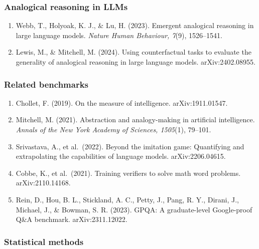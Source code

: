 \subsubsection{Analogical reasoning in LLMs}\label{analogical-reasoning-in-llms}

\begin{enumerate}
\def\labelenumi{\arabic{enumi}.}
\setcounter{enumi}{25}
\tightlist
\item
  Webb, T., Holyoak, K. J., \& Lu, H. (2023). Emergent analogical reasoning in large language models. \emph{Nature Human Behaviour, 7}(9), 1526--1541.
\item
  Lewis, M., \& Mitchell, M. (2024). Using counterfactual tasks to evaluate the generality of analogical reasoning in large language models. arXiv:2402.08955.
\end{enumerate}

\subsubsection{Related benchmarks}\label{related-benchmarks}

\begin{enumerate}
\def\labelenumi{\arabic{enumi}.}
\setcounter{enumi}{27}
\tightlist
\item
  Chollet, F. (2019). On the measure of intelligence. arXiv:1911.01547.
\item
  Mitchell, M. (2021). Abstraction and analogy-making in artificial intelligence. \emph{Annals of the New York Academy of Sciences, 1505}(1), 79--101.
\item
  Srivastava, A., et al.~(2022). Beyond the imitation game: Quantifying and extrapolating the capabilities of language models. arXiv:2206.04615.
\item
  Cobbe, K., et al.~(2021). Training verifiers to solve math word problems. arXiv:2110.14168.
\item
  Rein, D., Hou, B. L., Stickland, A. C., Petty, J., Pang, R. Y., Dirani, J., Michael, J., \& Bowman, S. R. (2023). GPQA: A graduate-level Google-proof Q\&A benchmark. arXiv:2311.12022.
\end{enumerate}

\subsubsection{Statistical methods}\label{statistical-methods}

